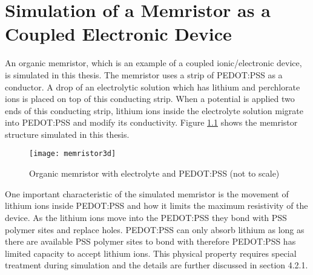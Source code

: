 
\chapter{Simulation of a Memristor as a Coupled Electronic Device} %

\label{Chapter4} %

\begin{doublespace}

An organic memristor, which is an example of a coupled ionic/electronic device, is simulated in this thesis. The memristor uses a strip of PEDOT:PSS as a conductor. A drop of an electrolytic solution which has lithium and perchlorate ions is placed on top of this conducting strip. When a potential is applied  two ends of this conducting strip, lithium ions inside the electrolyte solution migrate into PEDOT:PSS and modify its conductivity. Figure \ref{3dmem} shows the memristor structure simulated in this thesis.

\begin{figure}[!htp]
\centering
\texttt{[image: memristor3d]}
\caption{Organic memristor with electrolyte and PEDOT:PSS (not to scale)} 
\label{3dmem}
\end{figure}


One important characteristic of the simulated memristor is the movement of lithium ions inside PEDOT:PSS and how it limits the maximum resistivity of the device. As the lithium ions move into the PEDOT:PSS they bond with PSS polymer sites and replace holes. PEDOT:PSS can only absorb lithium as long as there are available PSS polymer sites to bond with therefore PEDOT:PSS has limited capacity to accept lithium ions. This physical property requires special treatment during simulation and the details are further discussed in section 4.2.1. 


\end{doublespace}
